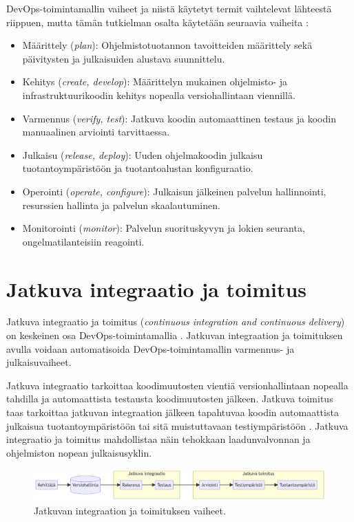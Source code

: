 DevOps-toimintamallin vaiheet ja niistä käytetyt termit vaihtelevat lähteestä riippuen, mutta tämän tutkielman osalta käytetään seuraavia vaiheita \cite{Alnafessah21}:

\begin{itemize}
\item Määrittely (\textit{plan}): Ohjelmistotuotannon tavoitteiden määrittely sekä päivitysten ja julkaisuiden alustava suunnittelu.
\item Kehitys (\textit{create, develop}): Määrittelyn mukainen ohjelmisto- ja infrastruktuurikoodin kehitys nopealla versiohallintaan viennillä.
\item Varmennus (\textit{verify, test}): Jatkuva koodin automaattinen testaus ja koodin manuaalinen arviointi tarvittaessa.
\item Julkaisu (\textit{release, deploy}): Uuden ohjelmakoodin julkaisu tuotantoympäristöön ja tuotantoalustan konfiguraatio.
\item Operointi (\textit{operate, configure}): Julkaisun jälkeinen palvelun hallinnointi, resurssien hallinta ja palvelun skaalautuminen.
\item Monitorointi (\textit{monitor}): Palvelun suorituskyvyn ja lokien seuranta, ongelmatilanteisiin reagointi.
\end{itemize}

\section{Jatkuva integraatio ja toimitus}

Jatkuva integraatio ja toimitus (\textit{continuous integration and continuous delivery}) on keskeinen osa DevOps-toimintamallia \cite{Jabbari16, Leite19}.
Jatkuvan integraation ja toimituksen avulla voidaan automatisoida DevOps-toimintamallin varmennus- ja julkaisuvaiheet.

Jatkuva integraatio tarkoittaa koodimuutosten vientiä versionhallintaan nopealla tahdilla ja automaattista testausta koodimuutosten jälkeen.
Jatkuva toimitus taas tarkoittaa jatkuvan integraation jälkeen tapahtuvaa koodin automaattista julkaisua tuotantoympäristöön tai sitä muistuttavaan testiympäristöön \cite{Shahin17}.
Jatkuva integraatio ja toimitus mahdollistaa näin tehokkaan laadunvalvonnan ja ohjelmiston nopean julkaisusyklin.

\begin{figure}[ht]
\begin{center}
\includegraphics[width=1\textwidth]{figures/cicd-pipeline.png}
\caption{Jatkuvan integraation ja toimituksen vaiheet.\label{fig:cicd}}
\end{center}
\end{figure}

